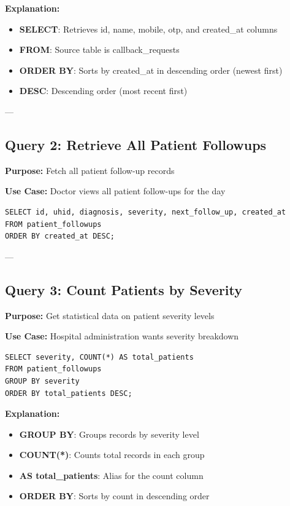 \documentclass[12pt,a4paper]{article}
\begin{document}
\textbf{Explanation:}
\begin{itemize}
    \item \textbf{SELECT}: Retrieves id, name, mobile, otp, and created\_at columns
    \item \textbf{FROM}: Source table is callback\_requests
    \item \textbf{ORDER BY}: Sorts by created\_at in descending order (newest first)
    \item \textbf{DESC}: Descending order (most recent first)
\end{itemize}

---

\subsection{Query 2: Retrieve All Patient Followups}

\textbf{Purpose:} Fetch all patient follow-up records

\textbf{Use Case:} Doctor views all patient follow-ups for the day

\begin{lstlisting}[caption={Get All Patient Followups}]
SELECT id, uhid, diagnosis, severity, next_follow_up, created_at
FROM patient_followups
ORDER BY created_at DESC;
\end{lstlisting}

---

\subsection{Query 3: Count Patients by Severity}

\textbf{Purpose:} Get statistical data on patient severity levels

\textbf{Use Case:} Hospital administration wants severity breakdown

\begin{lstlisting}[caption={Patient Count by Severity}]
SELECT severity, COUNT(*) AS total_patients
FROM patient_followups
GROUP BY severity
ORDER BY total_patients DESC;
\end{lstlisting}

\textbf{Explanation:}
\begin{itemize}
    \item \textbf{GROUP BY}: Groups records by severity level
    \item \textbf{COUNT(*)}: Counts total records in each group
    \item \textbf{AS total\_patients}: Alias for the count column
    \item \textbf{ORDER BY}: Sorts by count in descending order
\end{itemize}
\end{document}
